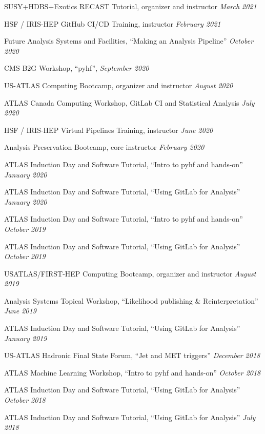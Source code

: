 \documentclass[margin,line]{resume}
\begin{document}
\begin{resume}
\begin{list2}
  \item SUSY+HDBS+Exotics RECAST Tutorial, organizer and instructor \hfill \textsl{March 2021}
  \item HSF / IRIS-HEP GitHub CI/CD Training, instructor \hfill \textsl{February 2021}
  \item Future Analysis Systems and Facilities, ``Making an Analysis Pipeline'' \hfill \textsl{October 2020}
  \item CMS B2G Workshop, ``pyhf'', \hfill \textsl{September 2020}
  \item US-ATLAS Computing Bootcamp, organizer and instructor \hfill \textsl{August 2020}
  \item ATLAS Canada Computing Workshop, GitLab CI and Statistical Analysis \hfill \textsl{July 2020}
  \item HSF / IRIS-HEP Virtual Pipelines Training, instructor \hfill \textsl{June 2020}
  \item Analysis Preservation Bootcamp, core instructor \hfill \textsl{February 2020}
  \item ATLAS Induction Day and Software Tutorial, ``Intro to pyhf and hands-on'' \hfill \textsl{January 2020}
  \item ATLAS Induction Day and Software Tutorial, ``Using GitLab for Analysis'' \hfill \textsl{January 2020}
  \item ATLAS Induction Day and Software Tutorial, ``Intro to pyhf and hands-on'' \hfill \textsl{October 2019}
  \item ATLAS Induction Day and Software Tutorial, ``Using GitLab for Analysis'' \hfill \textsl{October 2019}
  \item USATLAS/FIRST-HEP Computing Bootcamp, organizer and instructor \hfill \textsl{August 2019}
  \item Analysis Systems Topical Workshop, ``Likelihood publishing \& Reinterpretation'' \hfill \textsl{June 2019}
  \item ATLAS Induction Day and Software Tutorial, ``Using GitLab for Analysis'' \hfill \textsl{January 2019}
  \item US-ATLAS Hadronic Final State Forum, ``Jet and MET triggers'' \hfill \textsl{December 2018}
  \item ATLAS Machine Learning Workshop, ``Intro to pyhf and hands-on'' \hfill \textsl{October 2018}
  \item ATLAS Induction Day and Software Tutorial, ``Using GitLab for Analysis'' \hfill \textsl{October 2018}
  \item ATLAS Induction Day and Software Tutorial, ``Using GitLab for Analysis'' \hfill \textsl{July 2018}

\end{list2}
\end{resume}
\end{document}
